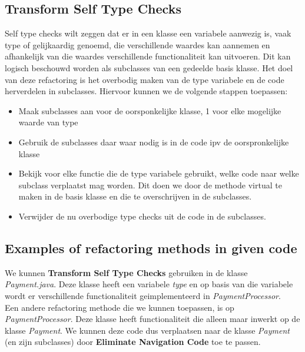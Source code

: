 \documentclass{article}
\begin{document}
\subsection{Transform Self Type Checks}
Self type checks wilt zeggen dat er in een klasse een variabele aanwezig is, vaak type of gelijkaardig genoemd, die verschillende waardes kan aannemen en afhankelijk van die waardes verschillende functionaliteit kan uitvoeren. Dit kan logisch beschouwd worden als subclasses van een gedeelde basis klasse. Het doel van deze refactoring is het overbodig maken van de type variabele en de code herverdelen in subclasses. Hiervoor kunnen we de volgende stappen toepassen:
\begin{itemize}
\item Maak subclasses aan voor de oorsponkelijke klasse, 1 voor elke mogelijke waarde van type
\item Gebruik de subclasses daar waar nodig is in de code ipv de oorspronkelijke klasse
\item Bekijk voor elke functie die de type variabele gebruikt, welke code naar welke subclass verplaatst mag worden. Dit doen we door de methode virtual te maken in de basis klasse en die te overschrijven in de subclasses.
\item Verwijder de nu overbodige type checks uit de code in de subclasses.
\end{itemize}

\subsection{Examples of refactoring methods in given code}
We kunnen \textbf{Transform Self Type Checks} gebruiken in de klasse \textit{Payment.java}. Deze klasse heeft een variabele \textit{type} en op basis van die variabele wordt er verschillende functionaliteit geimplementeerd in \textit{PaymentProcessor}.\\

Een andere refactoring methode die we kunnen toepassen, is op \textit{PaymentProcessor}. Deze klasse heeft functionaliteit die alleen maar inwerkt op de klasse \textit{Payment}. We kunnen deze code dus verplaatsen naar de klasse \textit{Payment}  (en zijn subclasses) door \textbf{Eliminate Navigation Code} toe te passen.
\end{document}
